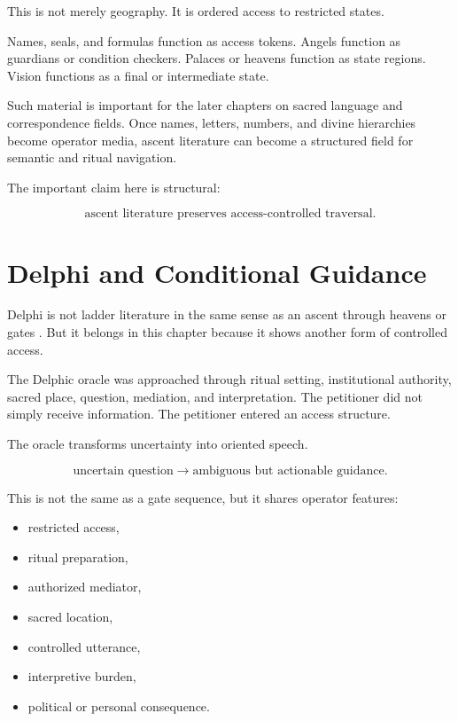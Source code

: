 \documentclass[11pt]{book}
\begin{document}
This is not merely geography. It is ordered access to restricted states.

Names, seals, and formulas function as access tokens. Angels function as guardians or condition checkers. Palaces or heavens function as state regions. Vision functions as a final or intermediate state.

Such material is important for the later chapters on sacred language and correspondence fields. Once names, letters, numbers, and divine hierarchies become operator media, ascent literature can become a structured field for semantic and ritual navigation.

The important claim here is structural:

\[
\text{ascent literature preserves access-controlled traversal}.
\]

\section{Delphi and Conditional Guidance}

Delphi is not ladder literature in the same sense as an ascent through heavens or gates \cite{Fontenrose1978DelphicOracle,ParkeWormell1956DelphicOracle}. But it belongs in this chapter because it shows another form of controlled access.

The Delphic oracle was approached through ritual setting, institutional authority, sacred place, question, mediation, and interpretation. The petitioner did not simply receive information. The petitioner entered an access structure.

The oracle transforms uncertainty into oriented speech.

\[
\text{uncertain question} \rightarrow \text{ambiguous but actionable guidance}.
\]

This is not the same as a gate sequence, but it shares operator features:

\begin{itemize}
    \item restricted access,
    \item ritual preparation,
    \item authorized mediator,
    \item sacred location,
    \item controlled utterance,
    \item interpretive burden,
    \item political or personal consequence.
\end{itemize}
\end{document}
